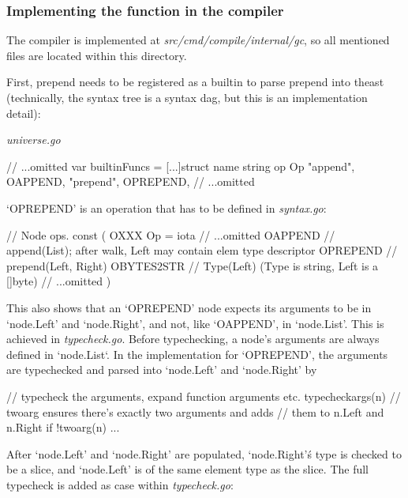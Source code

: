 \subsubsection{Implementing the function in the compiler}

The compiler is implemented at \textit{src/cmd/compile/internal/gc},
so all mentioned files are located within this directory.


First, prepend needs to be registered as a builtin to parse prepend into
the\gls{ast} (technically, the syntax tree is a syntax \gls{dag}\cite{ast-node-dag},
but this is an implementation detail):


\textit{universe.go}
\begin{gocode}
// ...omitted
var builtinFuncs = [...]struct {
	name string
	op   Op
}{
	{"append", OAPPEND},
	{"prepend", OPREPEND},
	// ...omitted
}
\end{gocode}

`OPREPEND' is an operation that has to be defined in \textit{syntax.go}:

\begin{gocode}
// Node ops.
const (
	OXXX Op = iota
	// ...omitted
	OAPPEND       // append(List); after walk, Left may contain elem type descriptor
	OPREPEND      // prepend(Left, Right)
	OBYTES2STR    // Type(Left) (Type is string, Left is a []byte)
	// ...omitted
)
\end{gocode}

This also shows that an `OPREPEND' node expects its arguments to be in `node.Left' and `node.Right', and not, like `OAPPEND', in `node.List'. This is achieved in
\textit{typecheck.go}. Before typechecking, a node's arguments are always
defined in `node.List`. In the implementation for `OPREPEND', the arguments are typechecked and parsed
into `node.Left' and `node.Right' by

\begin{gocode}
// typecheck the arguments, expand function arguments etc.
typecheckargs(n)
// twoarg ensures there's exactly two arguments and adds
// them to n.Left and n.Right
if !twoarg(n) ...
\end{gocode}

After `node.Left' and `node.Right' are populated, `node.Right'\'s type is checked to be
a slice, and `node.Left' is of the same element type as the slice.
The full typecheck is added as case within \textit{typecheck.go}:

